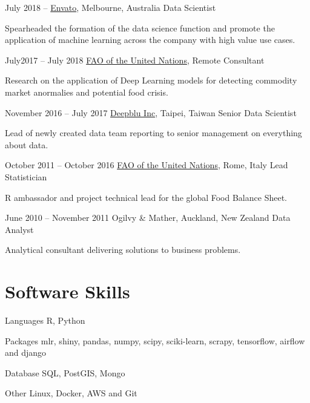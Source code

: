 \documentclass{tccv}
\begin{document}
\begin{eventlist}

\item{July 2018 -- }
  {\href{https://envato.com/}{Envato}, Melbourne, Australia}
  {Data Scientist}

  Spearheaded the formation of the data science function and promote
  the application of machine learning across the company with high
  value use cases.

\item{July2017 -- July 2018}
  {\href{http://www.fao.org/home/en/}{FAO of the United Nations}, Remote}
  {Consultant}

  Research on the application of Deep Learning models for detecting
  commodity market anormalies and potential food crisis.
  
\item{November 2016 -- July 2017}
  {\href{http://deepblu.com/}{Deepblu Inc}, Taipei, Taiwan}
  {Senior Data Scientist}

  Lead of newly created data team reporting to senior management on
  everything about data.

\item{October 2011 -- October 2016}
  {\href{http://www.fao.org/home/en/}{FAO of the United Nations}, Rome, Italy}
  {Lead Statistician}

  R ambassador and project technical lead for the global Food Balance Sheet.\\
  
\item{June 2010 -- November 2011}
  {Ogilvy \& Mather, Auckland, New Zealand}
  {Data Analyst}
  
  Analytical consultant delivering solutions to business
  problems. \\


\end{eventlist}



\section{Software Skills}
\begin{factlist}
\item{Languages}
  {R, Python}
\item{Packages} {mlr, shiny, pandas, numpy, scipy, sciki-learn,
  scrapy, tensorflow, airflow and django}
\item{Database}
  {SQL, PostGIS, Mongo}
\item{Other}
     {Linux, Docker, AWS and Git}
\end{factlist}
\end{document}
